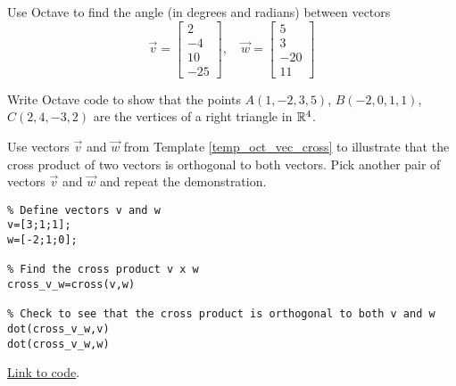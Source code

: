 \documentclass{ximera}
\begin{document}
\begin{problem}\label{prob_oct_vec_2}
    Use Octave to find the angle (in degrees and radians) between vectors 
    $$\vec{v}=\begin{bmatrix}2\\-4\\10\\-25\end{bmatrix},\quad\vec{w}=\begin{bmatrix}5\\3\\-20\\11\end{bmatrix}$$
\end{problem}

\begin{problem}\label{prob_oct_vec_3}
Write Octave code to show that the points $A(1, -2, 3, 5)$, $B(-2, 0, 1, 1)$, $C(2, 4, -3, 2)$ are the vertices of a right triangle in $\mathbb{R}^4$.
\end{problem}

\begin{problem}\label{prob_oct_vec_1}
    Use vectors $\vec{v}$ and $\vec{w}$ from Template \ref{temp_oct_vec_cross} to illustrate that the cross product of two vectors is orthogonal to both vectors.  Pick another pair of vectors $\vec{v}$ and $\vec{w}$ and repeat the demonstration.
    \begin{hint}
        \begin{verbatim}
% Define vectors v and w
v=[3;1;1];
w=[-2;1;0];

% Find the cross product v x w
cross_v_w=cross(v,w)

% Check to see that the cross product is orthogonal to both v and w
dot(cross_v_w,v)
dot(cross_v_w,w)
\end{verbatim}

\href{https://sagecell.sagemath.org/?z=eJxtjsEKwjAQRO-B_sNeCg1UsHoMOSn-RJES09UEpSvJmvj5phUUxNvMMG9na9jj2U8ICS1TiJDATCPkSiTdb1WnuqOqRNb9alPMejaVqOHgS4kdgg0UI9wDjQ_LBX7O6BIOach6UU1qs3xzO4f2CkwQEQtv-M8RH4ECO7rQZG5z90Tsvn-NxM1noE3yN8nyBT-BRHk=&lang=octave&interacts=eJyLjgUAARUAuQ==}{Link to code}.
    \end{hint}
\end{problem}
\end{document}
